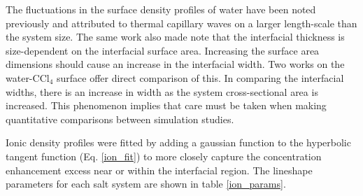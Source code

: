 
The fluctuations in the surface density profiles of water have been noted previously and attributed to thermal capillary waves on a larger length-scale than the system size.\cite{Chang1996} The same work also made note that the interfacial thickness is size-dependent on the interfacial surface area. Increasing the surface area dimensions should cause an increase in the interfacial width. Two works on the water-CCl$_4$ surface offer direct comparison of this.\cite{Chang1996,Hore2008} In comparing the interfacial widths, there is an increase in width as the system cross-sectional area is increased. This phenomenon implies that care must be taken when making quantitative comparisons between simulation studies.

Ionic density profiles were fitted by adding a gaussian function to the hyperbolic tangent function (Eq. \ref{ion_fit}) to more closely capture the concentration enhancement excess near or within the interfacial region. The lineshape parameters for each salt system are shown in table \ref{ion_params}.

